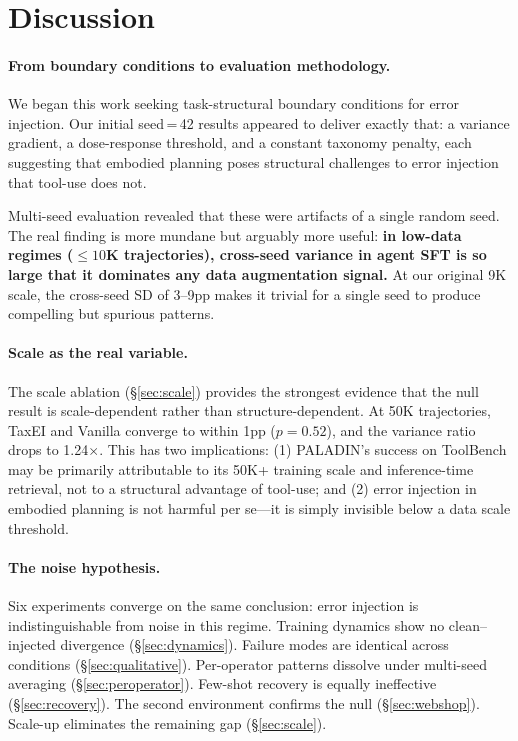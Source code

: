 \documentclass[11pt,a4paper]{article}
\begin{document}
\section{Discussion}

\paragraph{From boundary conditions to evaluation methodology.}
We began this work seeking task-structural boundary conditions for error injection.
Our initial seed\,=\,42 results appeared to deliver exactly that: a variance gradient, a dose-response threshold, and a constant taxonomy penalty, each suggesting that embodied planning poses structural challenges to error injection that tool-use does not.

Multi-seed evaluation revealed that these were artifacts of a single random seed.
The real finding is more mundane but arguably more useful: \textbf{in low-data regimes (${\leq}10$K trajectories), cross-seed variance in agent SFT is so large that it dominates any data augmentation signal.}
At our original 9K scale, the cross-seed SD of 3--9pp makes it trivial for a single seed to produce compelling but spurious patterns.

\paragraph{Scale as the real variable.}
The scale ablation (\S\ref{sec:scale}) provides the strongest evidence that the null result is scale-dependent rather than structure-dependent.
At 50K trajectories, TaxEI and Vanilla converge to within 1pp ($p{=}0.52$), and the variance ratio drops to 1.24$\times$.
This has two implications: (1) PALADIN's success on ToolBench may be primarily attributable to its 50K+ training scale and inference-time retrieval, not to a structural advantage of tool-use; and (2) error injection in embodied planning is not harmful per se---it is simply invisible below a data scale threshold.

\paragraph{The noise hypothesis.}
Six experiments converge on the same conclusion: error injection is indistinguishable from noise in this regime.
Training dynamics show no clean--injected divergence (\S\ref{sec:dynamics}).
Failure modes are identical across conditions (\S\ref{sec:qualitative}).
Per-operator patterns dissolve under multi-seed averaging (\S\ref{sec:peroperator}).
Few-shot recovery is equally ineffective (\S\ref{sec:recovery}).
The second environment confirms the null (\S\ref{sec:webshop}).
Scale-up eliminates the remaining gap (\S\ref{sec:scale}).
\end{document}

